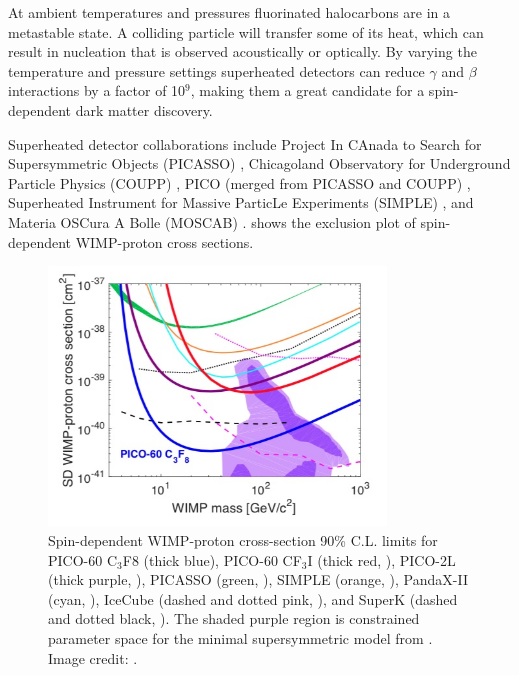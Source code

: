 At ambient temperatures and pressures fluorinated halocarbons are in a metastable state.  A colliding particle will transfer some of its
heat, which can result in nucleation that is observed acoustically or optically.  By varying the temperature and pressure settings
superheated detectors can reduce $\gamma$ and $\beta$ interactions by a factor of 10$^{9}$, making them a great candidate for a
spin-dependent dark matter discovery.

Superheated detector collaborations include Project In CAnada to Search for Supersymmetric Objects (PICASSO) ,
Chicagoland Observatory for Underground Particle Physics (COUPP) ,
PICO (merged from PICASSO and COUPP) , Superheated Instrument for Massive ParticLe Experiments (SIMPLE)
, and Materia OSCura A Bolle (MOSCAB) .   shows the exclusion plot of
spin-dependent WIMP-proton cross sections.


\begin{figure}
 \centering
 \includegraphics[width=0.8\textwidth]{spin_dependent_limits}
 \caption{Spin-dependent WIMP-proton cross-section 90\% C.L. limits for PICO-60 C$_{3}$F${8}$ (thick blue), PICO-60 CF$_{3}$I (thick red,
 ), PICO-2L (thick purple, ), PICASSO (green, ), SIMPLE (orange,
 ), PandaX-II (cyan, ), IceCube (dashed and dotted pink, ), and SuperK
 (dashed and
 dotted black, ).  The shaded purple region is constrained parameter space for the minimal
 supersymmetric model from .
 Image credit: .}
 \label{fig:sd_limits}
\end{figure}

